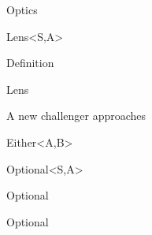 \documentclass[xcolor={dvipsnames}]{beamer}
\begin{document}
\begin{frame}

    \begin{center}
        \Huge Optics
    \end{center}

\end{frame}


\begin{frame}

    \begin{center}
        \Huge Lens<S,A>
    \end{center}

\end{frame}

\begin{frame}[fragile]{Definition}

    

\end{frame}

\begin{frame}{Lens}

    

\end{frame}

\begin{frame}{A new challenger approaches}

    \begin{center}
        \Huge Either<A,B>
    \end{center}

\end{frame}

\begin{frame}

    \begin{center}
        \Huge Optional<S,A>
    \end{center}

\end{frame}

\begin{frame}{Optional}
    
    
    
\end{frame}

\begin{frame}{Optional}
    
    
    
\end{frame}
\end{document}
